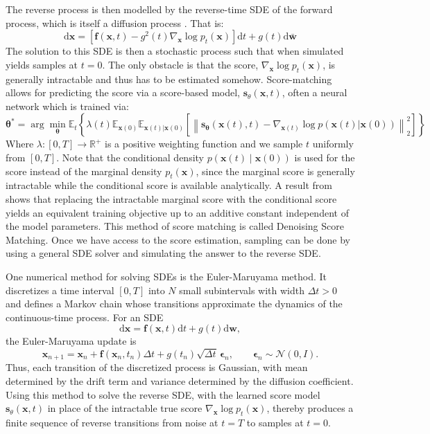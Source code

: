 The reverse process is then modelled by the reverse-time SDE of the forward process, which is itself a diffusion process \cite{ANDERSON1982313}. That is:
\begin{equation}
	    \text{d}\mathbf{x} = [\mathbf{f}(\mathbf{x}, t) - g^2(t)\nabla_{\mathbf{x}}\log p_t(\mathbf{x})]\text{d}t + g(t)\text{d}\bar{\mathbf{w}}
\end{equation}
The solution to this SDE is then a stochastic process such that when simulated yields samples at $t=0$. The only obstacle is that the score, $\nabla_{\mathbf{x}}\log p_t(\mathbf{x})$, is generally intractable and thus has to be estimated somehow. Score-matching \cite{10.5555/1046920.1088696} allows for predicting the score via a score-based model, $\mathbf{s}_{\theta}(\mathbf{x}, t)$, often a neural network which is trained via:
\begin{equation}
\boldsymbol{\theta}^* = \arg \min_{\boldsymbol{\theta}} \mathbb{E}_t \left\{ \lambda(t) \mathbb{E}_{\mathbf{x}(0)} \mathbb{E}_{\mathbf{x}(t) | \mathbf{x}(0)} \left[ \left\| \mathbf{s}_{\boldsymbol{\theta}}(\mathbf{x}(t), t) - \nabla_{\mathbf{x}(t)} \log p(\mathbf{x}(t) | \mathbf{x}(0)) \right\|_2^2 \right] \right\}
\end{equation}
Where $\lambda : [0,T] \to \mathbb{R}^+$ is a positive weighting function and we sample $t$ uniformly from $[0,T]$. Note that the conditional density $p(\mathbf{x}(t) \mid \mathbf{x}(0))$ is used for the score instead of the marginal density $p_t(\mathbf{x})$, since the marginal score is generally intractable while the conditional score is available analytically. A result from \cite{vincent} shows that replacing the intractable marginal score with the conditional score yields an equivalent training objective up to an additive constant independent of the model parameters. This method of score matching is called Denoising Score Matching. Once we have access to the score estimation, sampling can be done by using a general SDE solver and simulating the answer to the reverse SDE.

One numerical method for solving SDEs is the Euler-Maruyama method. It discretizes a time interval $[0,T]$ into $N$ small subintervals with width $\Delta t > 0$ and defines a Markov chain whose transitions approximate the dynamics of the continuous-time process. For an SDE
\[
    \mathrm{d}\mathbf{x} = \mathbf{f}(\mathbf{x},t)\mathrm{d}t + g(t)\mathrm{d}\mathbf{w},
\]
the Euler-Maruyama update is
\[
    \mathbf{x}_{n+1}
    =
    \mathbf{x}_n
    +
    \mathbf{f}(\mathbf{x}_n,t_n)\Delta t
    +
    g(t_n)\sqrt{\Delta t}\,\boldsymbol{\epsilon}_n,
    \qquad
    \boldsymbol{\epsilon}_n \sim \mathcal{N}(0,I).
\]
Thus, each transition of the discretized process is Gaussian, with mean determined by the drift term and variance determined by the diffusion coefficient. Using this method to solve the reverse SDE, with the learned score model $\mathbf{s}_\theta(\mathbf{x},t)$ in place of the intractable true score $\nabla_{\mathbf{x}}\log p_t(\mathbf{x})$, thereby produces a finite sequence of reverse transitions from noise at $t=T$ to samples at $t=0$.

